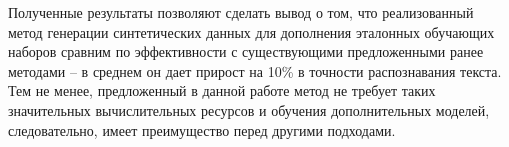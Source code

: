 Полученные результаты позволяют сделать вывод о том, что реализованный метод генерации синтетических данных для дополнения
эталонных обучающих наборов сравним по эффективности с существующими предложенными ранее методами --
в среднем он дает прирост на 10\% в точности распознавания текста.
Тем не менее, предложенный в данной работе метод не требует таких значительных вычислительных ресурсов и обучения дополнительных моделей,
следовательно, имеет преимущество перед другими подходами.